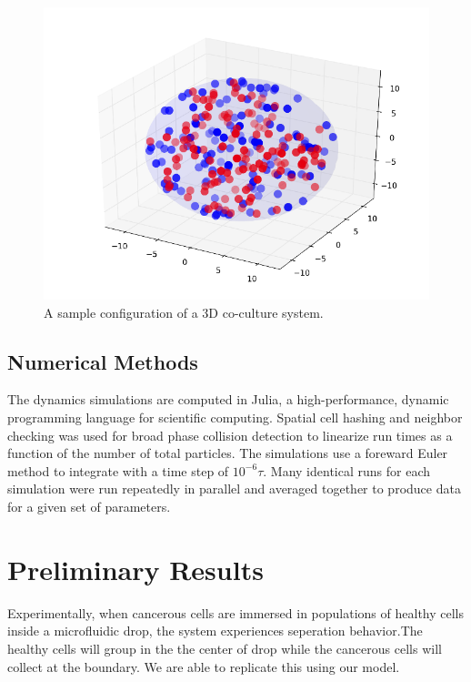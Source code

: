 \documentclass[aps,prb,twocolumn,groupedaddress,nofootinbib,floatfix]{revtex4}
\begin{document}
\begin{figure}
  \includegraphics[width=1.0\columnwidth]{3dconf.png}
  \caption[3dconf]
    {A sample configuration of a 3D co-culture system.}
   \label{fig:3dconf}
\end{figure}

\subsection*{Numerical Methods}

The dynamics simulations are computed in Julia, a high-performance, dynamic 
programming language for scientific computing. Spatial cell hashing and neighbor 
checking was used for broad phase collision detection to linearize run times 
as a function of the number of total particles. The simulations use a foreward 
Euler method to integrate with a time step of $10^{-6}\tau$. 
Many identical runs for each  simulation were run repeatedly in parallel and 
averaged together to produce data for a given set of parameters.

\section*{Preliminary Results}

Experimentally, when cancerous cells are immersed in populations of healthy cells
inside a microfluidic drop, the system experiences seperation behavior.The healthy 
cells will group in the the center of drop while the cancerous cells will collect
at the boundary. We are able to replicate this using our model.
\end{document}
